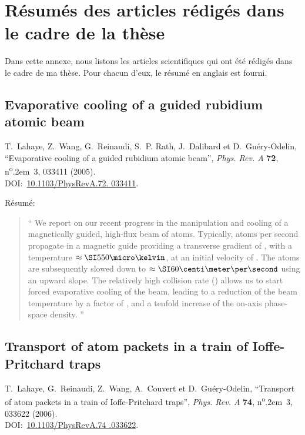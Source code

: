 \chapter{Résumés des articles rédigés dans le cadre de la thèse}\label{annexe:Articles}
Dans cette annexe, nous listons les articles scientifiques qui ont été rédigés dans le cadre de ma thèse. Pour chacun d'eux, le résumé en anglais est fourni.

\newcommand{\citearticleintoc}[1]%
{}

\section{Evaporative cooling of a guided rubidium atomic beam\citearticleintoc{LWR05}}\label{art:LWR05}
\noindent
{\sc T.~{Lahaye}}, {\sc Z.~{Wang}}, {\sc G.~{Reinaudi}}, {\sc S.~P. {Rath}},
  {\sc J.~{Dalibard}} et {\sc D.~{Gu{\'e}ry-Odelin}}, \enquote{{Evaporative
  cooling of a guided rubidium atomic beam}}, {\em Phys. Rev. A\/} {\bf 72},
  n\textsuperscript{o}\kern.2em\relax~3, 033411 (2005).
\\
  DOI:~\href{http://dx.doi.org/10.1103/PhysRevA.72.033411}{10.1103/PhysRevA.72.%
033411}.

\vspace{1ex}
Résumé:
\begin{quote}\enquote{
We report on our recent progress in the manipulation and cooling of a magnetically guided, high-flux beam of \Rb atoms. Typically,   atoms  per  second propagate in a magnetic guide providing a transverse gradient of , with a temperature $\approx\microK{550}$, at an initial velocity of . The atoms are subsequently slowed down to $\approx\cmps{60}$ using an upward slope. The relatively high collision rate () allows us to start forced evaporative cooling of the beam, leading to a reduction of the beam temperature by a factor of , and a tenfold increase of the on-axis phase-space density.%
}\end{quote}


\section{Transport of atom packets in a train of Ioffe-Pritchard traps\citearticleintoc{LRW06}}
\noindent 
{\sc T.~{Lahaye}}, {\sc G.~{Reinaudi}}, {\sc Z.~{Wang}}, {\sc A.~{Couvert}} et
  {\sc D.~{Gu{\'e}ry-Odelin}}, \enquote{{Transport of atom packets in a train
  of Ioffe-Pritchard traps}}, {\em Phys. Rev. A\/} {\bf 74},
  n\textsuperscript{o}\kern.2em\relax~3, 033622 (2006).
\\
  DOI:~\href{http://dx.doi.org/10.1103/PhysRevA.74.033622}{10.1103/PhysRevA.74%
.033622}.

